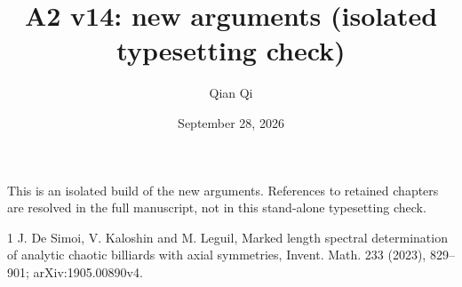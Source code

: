 
\title{A2 v14: new arguments (isolated typesetting check)}
\author{Qian Qi}
\date{September 28, 2026}

\maketitle
\noindent This is an isolated build of the new arguments. References to
retained chapters are resolved in the full manuscript, not in this
stand-alone typesetting check.


\begin{thebibliography}{1}
 J. De Simoi, V. Kaloshin and M. Leguil,
Marked length spectral determination of analytic chaotic billiards with axial
symmetries, Invent. Math. 233 (2023), 829--901; arXiv:1905.00890v4.
\end{thebibliography}


